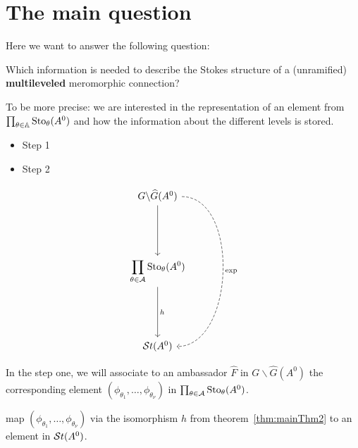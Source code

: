 \chapter{The main question}
Here we want to answer the following question:
\begin{einr}
  Which information is needed to describe the Stokes structure of a
  (unramified) \textbf{multileveled} meromorphic connection?
\end{einr}
To be more precise: we are interested in the representation of an element from
$\prod_{\theta\in\mathbb{A}}\operatorname{Sto}_\theta(A^0)$ and how the information about the
different levels is stored.

\bgroup
{}
\begin{paracol}{2}\sloppy
\switchcolumn[0]\noindent
  \vspace*{17mm}
  \begin{itemize}
    \item[] Step 1 
    \item[] Step 2 
  \end{itemize}
\switchcolumn[1]\noindent
  \[ \begin{tikzcd}[column sep=0,row sep=1.8cm]
      G\backslash\hat G(A^0)\dar{\tikzmark{e0}}
      \arrow[dd,dashed, out=0,in=0,"\exp"]
    \\\displaystyle \prod_{\theta\in\cA}\Sto_\theta(A^0)
      \dar{\tikzmark{e1}h}
    \\\St(A^0)
  \end{tikzcd} \]
\end{paracol}
\egroup
In the step one, we will associate to an ambassador $\hat F$ in
$G\backslash\hat G(A^0)$ the corresponding element
$(\phi_{\theta_1},\dots,\phi_{\theta_\nu})$ in
$\prod_{\theta\in\mathcal{A}}\operatorname{Sto}_\theta(A^0)$. 

 map
$(\phi_{\theta_1},\dots,\phi_{\theta_\nu})$ via the isomorphism $h$ from
theorem~\ref{thm:mainThm2} to an element in $\mathcal{S}{}t(A^0)$.

\begin{comment}
  As an third step, we will apply the morphism $\exp$ from the
  theorem~\ref{thm:mainThm1} and hopefully get the same element in $\St(A^0)$
\end{comment}

